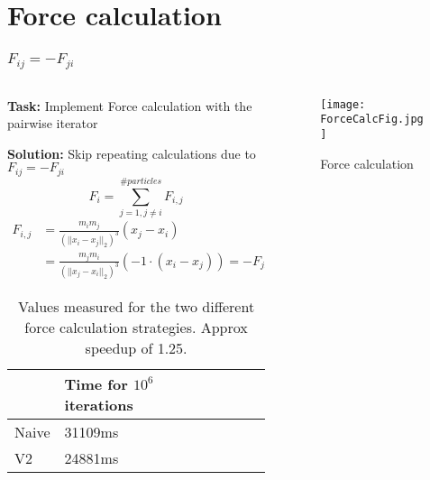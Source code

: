 \section{Force calculation}

\begin{frame}
    \frametitle{$F_{ij} = -F_{ji}$}

    \begin{columns}
        \begin{column}{0.5\textwidth}
            \textbf{Task:} Implement Force calculation with the pairwise iterator

            \textbf{Solution:} Skip repeating calculations due to $F_{ij} = -F_{ji}$
            \vspace{-15pt}
            \begin{equation}
                F_i = \sum_{j=1, j \neq i}^{\#particles} F_{i,j}
            \end{equation}
            \vspace{-15pt}
            \begin{align}
                F_{i,j} &= \frac{m_im_j}{(||x_i-x_j||_2)^3} (x_j - x_i) \\
                        &= \frac{m_jm_i}{(||x_j-x_i||_2)^3} \left(-1 \cdot \left(x_i - x_j\right)\right) = - F_{j,i}
            \end{align}

            \vspace{-15pt}

            \begin{table}[H]
                \begin{tabular}{|l|l|l|l|l|}
                \hline
                    & Time for $10^6$ iterations \\ \hline
                Naive & 31109ms                  \\ \hline
                V2    & 24881ms                  \\ \hline
                \end{tabular}
                \caption{Values measured for the two different force calculation strategies. Approx speedup of 1.25.}
                \label{tab:speedup}
            \end{table}
        \end{column}
        \begin{column}{0.5\textwidth}
            \begin{figure}[]
                \centering
                \texttt{[image: ForceCalcFig.jpg]}
                \caption{Force calculation}
            \end{figure}
        \end{column}
    \end{columns}

    
\end{frame}